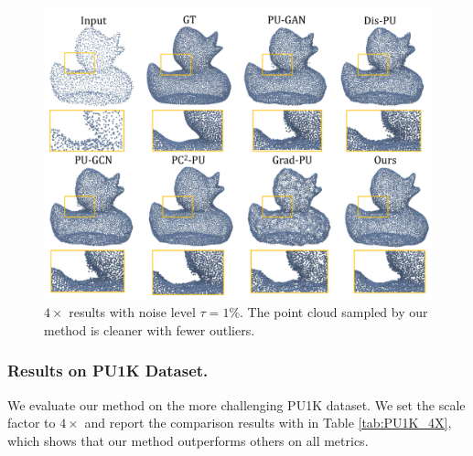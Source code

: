 \documentclass[letterpaper]{article} %
\begin{document}
\begin{figure}
\centering
\includegraphics[width=1.0\linewidth]{robustness_noise.pdf}
\caption{$4\times$ results with noise level $\tau=1\%$. The point cloud sampled by our method is cleaner with fewer outliers.}
\label{fig:robust_noise}
\end{figure}

\subsubsection{Results on PU1K Dataset.}
We evaluate our method on the more challenging PU1K dataset. We set the scale factor to $4\times$ and report the comparison results with \cite{yu2018pu, yifan2019patch, qian2021pu, li2021point, qiu2022pu, dell2022arbitrary, he2023grad} in Table \ref{tab:PU1K_4X}, which shows that our method outperforms others on all metrics.
\begin{table}
    \small
    \centering
    \caption{Quantitative comparison between our method and the state-of-the-art methods on the PU-GAN dataset with different noise level $\tau$.}
    \label{tab:PUGAN_noise}
\end{table}
\end{document}
